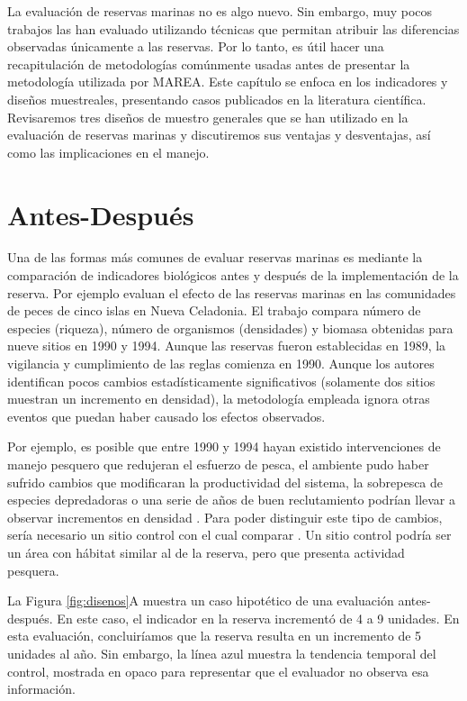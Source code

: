 \documentclass[]{krantz}
\begin{document}
La evaluación de reservas marinas no es algo nuevo. Sin embargo, muy
pocos trabajos las han evaluado utilizando técnicas que permitan
atribuir las diferencias observadas únicamente a las reservas. Por lo
tanto, es útil hacer una recapitulación de metodologías comúnmente
usadas antes de presentar la metodología utilizada por MAREA. Este
capítulo se enfoca en los indicadores y diseños muestreales, presentando
casos publicados en la literatura científica. Revisaremos tres diseños
de muestro generales que se han utilizado en la evaluación de reservas
marinas y discutiremos sus ventajas y desventajas, así como las
implicaciones en el manejo.

\hypertarget{antes-despues}{%
\section{Antes-Después}\label{antes-despues}}

Una de las formas más comunes de evaluar reservas marinas es mediante la
comparación de indicadores biológicos antes y después de la
implementación de la reserva. Por ejemplo \citet{wantiez_1997} evaluan
el efecto de las reservas marinas en las comunidades de peces de cinco
islas en Nueva Celadonia. El trabajo compara número de especies
(riqueza), número de organismos (densidades) y biomasa obtenidas para
nueve sitios en 1990 y 1994. Aunque las reservas fueron establecidas en
1989, la vigilancia y cumplimiento de las reglas comienza en 1990.
Aunque los autores identifican pocos cambios estadísticamente
significativos (solamente dos sitios muestran un incremento en
densidad), la metodología empleada ignora otras eventos que puedan haber
causado los efectos observados.

Por ejemplo, es posible que entre 1990 y 1994 hayan existido
intervenciones de manejo pesquero que redujeran el esfuerzo de pesca, el
ambiente pudo haber sufrido cambios que modificaran la productividad del
sistema, la sobrepesca de especies depredadoras o una serie de años de
buen reclutamiento podrían llevar a observar incrementos en densidad
\citep{szuwalski_2017, chavez_2003}. Para poder distinguir este tipo de
cambios, sería necesario un sitio control con el cual comparar
\citep{betti_2017}. Un sitio control podría ser un área con hábitat
similar al de la reserva, pero que presenta actividad pesquera.

La Figura \ref{fig:disenos}A muestra un caso hipotético de una
evaluación antes-después. En este caso, el indicador en la reserva
incrementó de 4 a 9 unidades. En esta evaluación, concluiríamos que la
reserva resulta en un incremento de 5 unidades al año. Sin embargo, la
línea azul muestra la tendencia temporal del control, mostrada en opaco
para representar que el evaluador no observa esa información.
\end{document}
